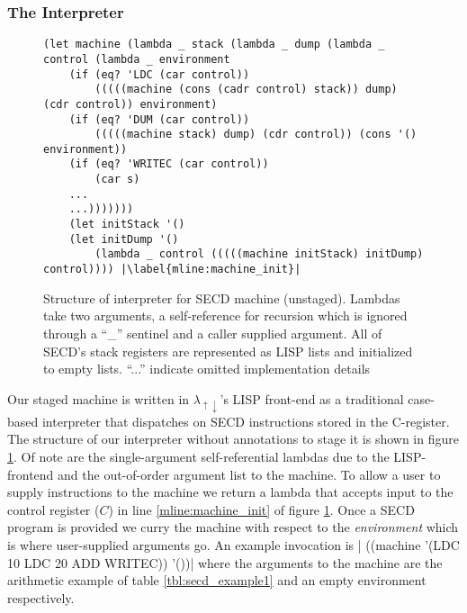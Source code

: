 \documentclass[a4paper,12pt,twoside,openright]{report}
\theoremstyle{definition}
\newcommand{\mslang}{$\lambda_{\uparrow\downarrow}$}
\begin{document}

\newpage
\subsubsection{The Interpreter}\label{subsec:secd_interp}
\begin{figure}[htp!]
\centering
\begin{verbatim}
(let machine (lambda _ stack (lambda _ dump (lambda _ control (lambda _ environment
    (if (eq? 'LDC (car control))
        (((((machine (cons (cadr control) stack)) dump) (cdr control)) environment)
    (if (eq? 'DUM (car control))
        (((((machine stack) dump) (cdr control)) (cons '() environment))
    (if (eq? 'WRITEC (car control))
        (car s)
    ...
    ...)))))))
    (let initStack '()
    (let initDump '()
        (lambda _ control (((((machine initStack) initDump) control)))) |\label{mline:machine_init}|
\end{verbatim}
\caption{Structure of interpreter for SECD machine (unstaged). Lambdas take two arguments, a self-reference for recursion which is ignored through a ``\_'' sentinel and a caller supplied argument. All of SECD's stack registers are represented as LISP lists and initialized to empty lists. ``...'' indicate omitted implementation details}
\label{lst:secd_unstaged}
\end{figure}

Our staged machine is written in \mslang's LISP front-end as a traditional case-based interpreter that dispatches on SECD instructions stored in the C-register. The structure of our interpreter without annotations to stage it is shown in figure \ref{lst:secd_unstaged}. Of note are the single-argument self-referential lambdas due to the LISP-frontend and the out-of-order argument list to the machine. To allow a user to supply instructions to the machine we return a lambda that accepts input to the control register ($C$) in line \ref{mline:machine_init} of figure \ref{lst:secd_unstaged}. Once a SECD program is provided we curry the machine with respect to the \textit{environment} which is where user-supplied arguments go. An example invocation is |  ((machine '(LDC 10 LDC 20 ADD WRITEC)) '())| where the arguments to the machine are the arithmetic example of table \ref{tbl:secd_example1} and an empty environment respectively.
\end{document}
